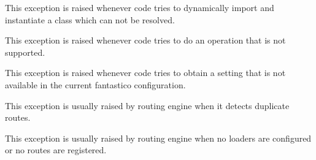 \documentclass[letterpaper,10pt,english]{sphinxmanual}
\begin{document}
\begin{fulllineitems}
\label{features/exceptions:fantastico.exceptions.FantasticoClassNotFoundError}
This exception is raised whenever code tries to dynamically import and instantiate a class which can not be resolved.

\end{fulllineitems}


\begin{fulllineitems}
\label{features/exceptions:fantastico.exceptions.FantasticoNotSupportedError}
This exception is raised whenever code tries to do an operation that is  not supported.

\end{fulllineitems}


\begin{fulllineitems}
\label{features/exceptions:fantastico.exceptions.FantasticoSettingNotFoundError}
This exception is raised whenever code tries to obtain a setting that is not available in the current fantastico
configuration.

\end{fulllineitems}


\begin{fulllineitems}
\label{features/exceptions:fantastico.exceptions.FantasticoDuplicateRouteError}
This exception is usually raised by routing engine when it detects duplicate routes.

\end{fulllineitems}


\begin{fulllineitems}
\label{features/exceptions:fantastico.exceptions.FantasticoNoRoutesError}
This exception is usually raised by routing engine when no loaders are configured or no routes are registered.

\end{fulllineitems}
\end{document}
